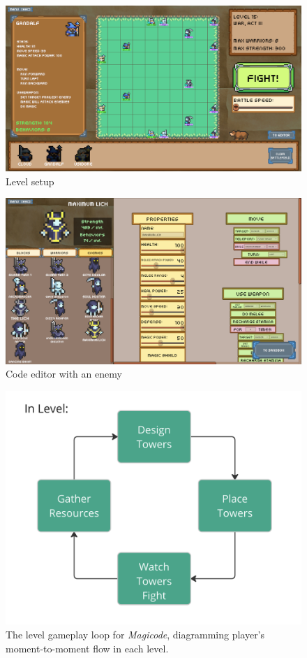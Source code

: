 \documentclass[10pt,twocolumn]{article}
\begin{document}
\begin{figure}
    \centering
    \includegraphics[width=\linewidth]{images/screenshots/level_setup.png}
    \caption{Level setup}
    \label{fig:level-screenshot}
\end{figure}

\begin{figure}
    \centering
    \includegraphics[width=\linewidth]{images/screenshots/lich_editor.png}
    \caption{Code editor with an enemy}
    \label{fig:enemy-screenshot}
\end{figure}

\begin{figure}
    \centering
    \includegraphics[width=.5\linewidth]{images/level-loop.png}
    \caption{The level gameplay loop for \textit{Magicode}, diagramming player's moment-to-moment flow in each level.}
    \label{fig:level-loop}
\end{figure}
\end{document}
